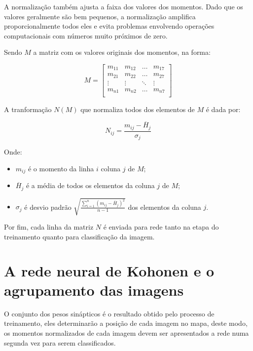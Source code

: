 A normalização também ajusta a faixa dos valores dos momentos. Dado que os
valores geralmente são bem pequenos, a normalização amplifica proporcionalmente
todos eles e evita problemas envolvendo operações computacionais com números
muito próximos de zero.

Sendo $ M $ a matriz com os valores originais dos momentos, na forma:

\begin{equation}\label{eq:momentos_matriz}
  M = \left[
    \begin{array}{cccc}
        m_{11} & m_{12} & \hdots & m_{17} \\
        m_{21} & m_{22} & \hdots & m_{27} \\
        \vdots & \vdots & \ddots & \vdots \\
        m_{n1} & m_{n2} & \hdots & m_{n7} \\
    \end{array}
  \right]
\end{equation}

A tranformação $ N(M) $ que normaliza todos dos elementos de $ M $ é dada por:

\begin{equation}\label{eq:momentos_transformacao}
  N_{ij} = \frac{m_{ij} - \overline{H}_j}{\sigma_j}
\end{equation}

Onde:

\begin{itemize}
\item $ m_{ij} $ é o momento da linha $ i $ coluna $ j $ de $ M $;
\item $ \overline{H}_j $ é a média de todos os elementos da coluna $ j $ de $ M $;
\item $ \sigma_j $ é desvio padrão $ \sqrt{\frac{\sum_{i=1}^n (m_{ij} - \overline{H}_j)^2}{n - 1}} $
      dos elementos da coluna $ j $.
\end{itemize}

Por fim, cada linha da matriz $ N $ é enviada para rede tanto na etapa do treinamento
quanto para classificação da imagem.

\section{A rede neural de Kohonen e o agrupamento das imagens}\label{sec:rede_kohonen_imagens}

O conjunto dos pesos sinápticos é o resultado obtido pelo processo de
treinamento, eles determinarão a posição de cada imagem no mapa, deste modo, os
momentos normalizados de cada imagem devem ser apresentados a rede numa segunda
vez para serem classificados.

